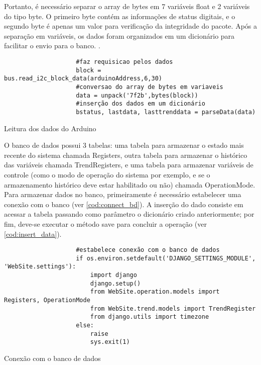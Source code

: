 				Portanto, é necessário separar o array de bytes em 7 variáveis float e 2 variáveis do tipo byte. O primeiro byte contém as informações de status digitais, e o segundo byte é apenas um valor para verificação da integridade do pacote. Após a separação em variáveis, os dados foram organizados em um dicionário para facilitar o envio para o banco. \cite{mark2013}.
				
				\begin{listing}[!htb]
					\begin{verbatim}
					#faz requisicao pelos dados
					block = bus.read_i2c_block_data(arduinoAddress,6,30)
					#conversao do array de bytes em variaveis
					data = unpack('7f2b',bytes(block))
					#inserção dos dados em um dicionário
					bstatus, lastdata, lasttrenddata = parseData(data)			
					\end{verbatim}
					\caption{Leitura dos dados do Arduino}
					\label{cod:read_arduino}
				\end{listing}
			
				O banco de dados possui 3 tabelas: uma tabela para armazenar o estado mais recente do sistema chamada Registers, outra tabela para armazenar o histórico das variáveis chamada TrendRegisters, e uma tabela para armazenar variáveis de controle (como o modo de operação do sistema por exemplo, e se o armazenamento histórico deve estar habilitado ou não) chamada OperationMode. Para armazenar dados no banco, primeiramente é necessário estabelecer uma conexão com o banco (ver \autoref{cod:connect_bd}). A inserção do dado consiste em acessar a tabela passando como parâmetro o dicionário criado anteriormente; por fim, deve-se executar o método save para concluir a operação (ver \autoref{cod:insert_data}).
				
				\begin{listing}[!htb]
					\begin{verbatim}
					#estabelece conexão com o banco de dados
					if os.environ.setdefault('DJANGO_SETTINGS_MODULE', 'WebSite.settings'):
						import django
						django.setup()
						from WebSite.operation.models import Registers, OperationMode
						from WebSite.trend.models import TrendRegister
						from django.utils import timezone
					else:
						raise
						sys.exit(1)
					\end{verbatim}
					\caption{Conexão com o banco de dados}
					\label{cod:connect_bd}
				\end{listing}
			
